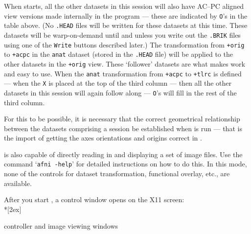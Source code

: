 When \afnit starts, all the other datasets in this session
will also have AC--PC aligned view versions made internally
in the program --- these are indicated by {\tt O}'s in the
table above.  (No {\tt .HEAD} files will be written for these
datasets at this time.  These datasets will be warp-on-demand
until and unless you write out the {\tt .BRIK} files using
one of the {\tt Write} buttons described later.)
The transformation from {\tt +orig} to {\tt +acpc}
in the {\tt anat} dataset (stored in the {\tt .HEAD} file) will
be applied to the other datasets in the {\tt +orig} view.  These
`follower' datasets are what makes \afnit work and easy to use.  When the
{\tt anat} transformation from {\tt +acpc} to {\tt +tlrc} is defined
--- when the {\tt X} is placed at the top of the third column ---
then all the other datasets in this session will again
follow along --- {\tt O}'s will fill in the rest of the third column.

For this to be possible, it is necessary that the correct
geometrical relationship
between the datasets comprising a session be established when
\tothreedit is run --- that is the import of getting the axes
orientations and origins correct in \tothreed.

\afnit is
also capable of directly reading in and displaying
a set of image files.  Use the command `{\tt afni~-help}' for
detailed instructions on how to do this.  In this mode, none
of the controls for dataset transformation, functional overlay,
etc\@., are available.

\goodbreak\begin{samepage}
After you start \afni, a control window opens on the X11 screen:\\*[2ex]
\centerline{\epsfysize=3.2in\blob
            \epsfysize=3.2in}\vspace{1ex}
\centerline{\sf \afnit controller and image viewing windows}
\end{samepage}\goodbreak

